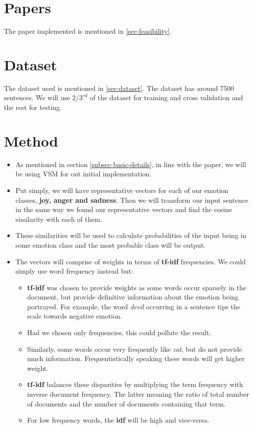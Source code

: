 \section{Papers}
The paper implemented is mentioned in \ref{sec-feasibility}.
\section{Dataset}
The dataset used is mentioned in \ref{sec-dataset}. The dataset has around 7500 sentences. We will use 2/$3^{rd}$ of the dataset for training and cross validation and the rest for testing.
\section{Method}
\begin{itemize}
\item As mentioned in section \ref{subsec-basic-details}, in line with the paper, we will be using VSM for out initial implementation.
\item Put simply, we will have representative vectors for each of our emotion classes, \textbf{joy, anger and sadness}. Then we will transform our input sentence in the same way we found our representative vectors and find the cosine similarity with each of them.
\item These similarities will be used to calculate probabilities of the input being in some emotion class and the most probable class will be output.
\item The vectors will comprise of weights in terms of \textbf{tf-idf} frequencies. We could simply use word frequency instead but:
	\begin{itemize}
		\item \textbf{tf-idf} was chosen to provide weights as some words occur sparsely in the document, but provide definitive information about the emotion being portrayed. For example, the word \emph{devil} occurring in a sentence tips the scale towards negative emotion.
		\item Had we chosen only frequencies, this could pollute the result.
		\item Similarly, some words occur very frequently like \emph{cat}, but do not provide much information. Frequentistically speaking these words will get higher weight.
		\item \textbf{tf-idf} balances these disparities by multiplying the term frequency with inverse document frequency. The latter meaning the ratio of total number of documents and the number of documents containing that term.
		\item For low frequency words, the \textbf{idf} will be high and vice-versa.
	\end{itemize}
\end{itemize}

